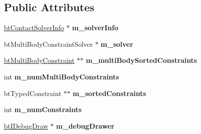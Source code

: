 \subsection*{Public Attributes}
\begin{DoxyCompactItemize}
\item 
\hypertarget{struct_multi_body_inplace_solver_island_callback_a97088115fb4f0c96a71ccdcdd404176a}{\hyperlink{structbt_contact_solver_info}{bt\+Contact\+Solver\+Info} $\ast$ {\bfseries m\+\_\+solver\+Info}}\label{struct_multi_body_inplace_solver_island_callback_a97088115fb4f0c96a71ccdcdd404176a}

\item 
\hypertarget{struct_multi_body_inplace_solver_island_callback_affca477e35f6360d87bfb02471c33c8b}{bt\+Multi\+Body\+Constraint\+Solver $\ast$ {\bfseries m\+\_\+solver}}\label{struct_multi_body_inplace_solver_island_callback_affca477e35f6360d87bfb02471c33c8b}

\item 
\hypertarget{struct_multi_body_inplace_solver_island_callback_ac0118bc50ed01ddfd2486b8f2029ddb7}{\hyperlink{classbt_multi_body_constraint}{bt\+Multi\+Body\+Constraint} $\ast$$\ast$ {\bfseries m\+\_\+multi\+Body\+Sorted\+Constraints}}\label{struct_multi_body_inplace_solver_island_callback_ac0118bc50ed01ddfd2486b8f2029ddb7}

\item 
\hypertarget{struct_multi_body_inplace_solver_island_callback_af6a86737e6f7d8aa0b6eecb96debff20}{int {\bfseries m\+\_\+num\+Multi\+Body\+Constraints}}\label{struct_multi_body_inplace_solver_island_callback_af6a86737e6f7d8aa0b6eecb96debff20}

\item 
\hypertarget{struct_multi_body_inplace_solver_island_callback_a8faedc7e6997edece13c1d43d8e2c72b}{bt\+Typed\+Constraint $\ast$$\ast$ {\bfseries m\+\_\+sorted\+Constraints}}\label{struct_multi_body_inplace_solver_island_callback_a8faedc7e6997edece13c1d43d8e2c72b}

\item 
\hypertarget{struct_multi_body_inplace_solver_island_callback_a9dfeb52eb5c0e0f4b5a42c41df0a359c}{int {\bfseries m\+\_\+num\+Constraints}}\label{struct_multi_body_inplace_solver_island_callback_a9dfeb52eb5c0e0f4b5a42c41df0a359c}

\item 
\hypertarget{struct_multi_body_inplace_solver_island_callback_ad610ed43d22e0d2a7c2c656f056fc6e9}{\hyperlink{classbt_i_debug_draw}{bt\+I\+Debug\+Draw} $\ast$ {\bfseries m\+\_\+debug\+Drawer}}\label{struct_multi_body_inplace_solver_island_callback_ad610ed43d22e0d2a7c2c656f056fc6e9}


\end{DoxyCompactItemize}
